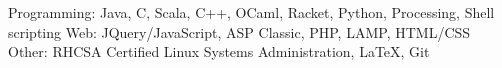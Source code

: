 \begin{cvskills}
    \cvskill
    {Programming:}
    {Java, C, Scala, C++, OCaml, Racket, Python, Processing, Shell scripting}
	\cvskill
	{Web:}
	{JQuery/JavaScript, ASP Classic, PHP, LAMP, HTML/CSS}
	\cvskill
	{Other:}
	{RHCSA Certified Linux Systems Administration, LaTeX, Git}
	\vspace{-1.5em} %
\end{cvskills}
